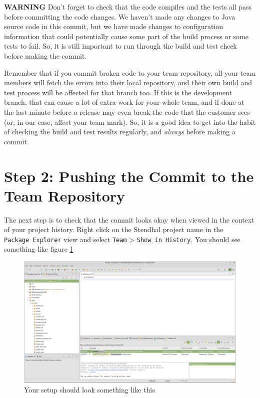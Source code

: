 \documentclass[
]{book}
\begin{document}
\textbf{WARNING}
Don't forget to check that the code compiles and the tests all pass before committing the code changes. We haven't made any changes to Java source code in this commit, but we have made changes to configuration information that could potentially cause some part of the build process or some tests to fail. So, it is still important to run through the build and test check before making the commit.

Remember that if you commit broken code to your team repository, all your team members will fetch the errors into their local repository, and their own build and test process will be affected for that branch too. If this is the development branch, that can cause a lot of extra work for your whole team, and if done at the last minute before a release may even break the code that the customer sees (or, in our case, affect your team mark). So, it is a good idea to get into the habit of checking the build and test results regularly, and \emph{always} before making a commit.

\hypertarget{pushing}{%
\section{Step 2: Pushing the Commit to the Team Repository}\label{pushing}}

The next step is to check that the commit looks okay when viewed in the context of your project history. Right click on the Stendhal project name in the \texttt{Package\ Explorer} view and select \texttt{Team} \textgreater{} \texttt{Show\ in\ History}. You should see something like figure \ref{fig:localCommitGraphBeforePushNoHistory-fig}

\begin{figure}

{\centering \includegraphics[width=1\linewidth]{images/localCommitGraphBeforePushNoHistory} 

}

\caption{Your setup should look something like this}\label{fig:localCommitGraphBeforePushNoHistory-fig}
\end{figure}
\end{document}
